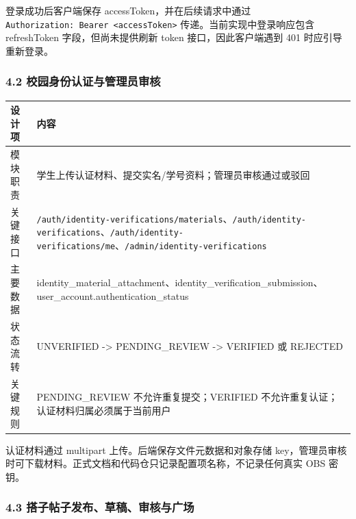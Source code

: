 \documentclass[
]{ctexart}
\begin{document}
登录成功后客户端保存 accessToken，并在后续请求中通过
\texttt{Authorization:\ Bearer\ \textless{}accessToken\textgreater{}}
传递。当前实现中登录响应包含 refreshToken 字段，但尚未提供刷新 token
接口，因此客户端遇到 401 时应引导重新登录。

\hypertarget{ux6821ux56edux8eabux4efdux8ba4ux8bc1ux4e0eux7ba1ux7406ux5458ux5ba1ux6838}{%
\subsubsection{4.2
校园身份认证与管理员审核}\label{ux6821ux56edux8eabux4efdux8ba4ux8bc1ux4e0eux7ba1ux7406ux5458ux5ba1ux6838}}

\begin{longtable}[]{@{}
  >{\raggedright\arraybackslash}p{}
  >{\raggedright\arraybackslash}p{}@{}}
\toprule
设计项 & 内容 \\
\midrule
\endhead
模块职责 & 学生上传认证材料、提交实名/学号资料；管理员审核通过或驳回 \\
关键接口 &
\texttt{/auth/identity-verifications/materials}、\texttt{/auth/identity-verifications}、\texttt{/auth/identity-verifications/me}、\texttt{/admin/identity-verifications} \\
主要数据 &
identity\_material\_attachment、identity\_verification\_submission、user\_account.authentication\_status \\
状态流转 & UNVERIFIED -\textgreater{} PENDING\_REVIEW -\textgreater{}
VERIFIED 或 REJECTED \\
关键规则 & PENDING\_REVIEW 不允许重复提交；VERIFIED
不允许重复认证；认证材料归属必须属于当前用户 \\
\bottomrule
\end{longtable}

认证材料通过 multipart 上传。后端保存文件元数据和对象存储
key，管理员审核时可下载材料。正式文档和代码仓只记录配置项名称，不记录任何真实
OBS 密钥。

\hypertarget{ux642dux5b50ux5e16ux5b50ux53d1ux5e03ux8349ux7a3fux5ba1ux6838ux4e0eux5e7fux573a}{%
\subsubsection{4.3
搭子帖子发布、草稿、审核与广场}\label{ux642dux5b50ux5e16ux5b50ux53d1ux5e03ux8349ux7a3fux5ba1ux6838ux4e0eux5e7fux573a}}
\end{document}
